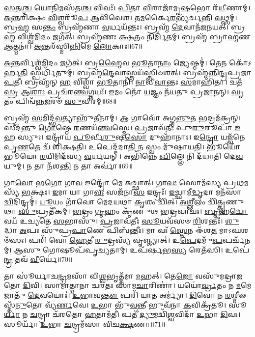 \-\ul{𑌸}\-𑌤\-\ul{𑌶𑍍𑌚} 𑌯𑍋\-\ul{𑌨𑌿}\-𑌮𑌸᳴𑌤\-\ul{𑌶𑍍𑌚} 𑌵𑌿𑌵𑌃᳴।
\-\ul{𑌪𑌿}\-𑌤𑌾 \ul{𑌵𑌿}\-𑌰𑌾𑌜𑌾᳴𑌮𑍃\-\ul{𑌷}\-𑌭𑍋 𑌰᳴\-\ul{𑌯𑍀}\-𑌣𑌾𑌮𑍍।
\-\ul{𑌅}\-𑌨𑍍𑌤𑌰𑌿᳴𑌕𑍍𑌷𑌂 \ul{𑌵𑌿}\-𑌶𑍍𑌵𑌰𑍂᳴\-\ul{𑌪} 𑌆𑌵𑌿᳴𑌵𑍇𑌶।
𑌤\-\ul{𑌮}\-𑌰𑍍𑌕𑍈\-\ul{𑌰}\-𑌭𑍍𑌯᳴𑌰𑍍𑌚𑌨𑍍𑌤𑌿 \ul{𑌵}\-𑌥𑍍𑌸𑌮𑍍।
𑌬𑍍𑌰\-\ul{𑌹𑍍𑌮} 𑌸\-\ul{𑌨𑍍𑌤𑌂} 𑌬𑍍𑌰𑌹𑍍𑌮᳴𑌣𑌾 \ul{𑌵}\-𑌰𑍍𑌧𑌯᳴𑌨𑍍𑌤𑌃।
𑌬𑍍𑌰𑌹𑍍𑌮᳴ \ul{𑌦𑍇}\-𑌵𑌾𑌨᳴𑌜𑌨𑌯𑌤𑍍।
𑌬𑍍𑌰\-\ul{𑌹𑍍𑌮} 𑌵𑌿𑌶𑍍𑌵᳴\-\ul{𑌮𑌿}\-𑌦𑌂 𑌜𑌗᳴𑌤𑍍।
𑌬𑍍𑌰𑌹𑍍𑌮᳴𑌣𑌃 \ul{𑌕𑍍𑌷}\-𑌤𑍍𑌰𑌂 𑌨𑌿𑌰𑍍𑌮𑌿᳴𑌤𑌮𑍍।
𑌬𑍍𑌰𑌹𑍍𑌮᳴ 𑌬𑍍𑌰𑌾\-\ul{𑌹𑍍𑌮}\-𑌣 \ul{𑌆}\-𑌤𑍍𑌮𑌨𑌾॑।
\-\ul{𑌅}\-𑌨𑍍𑌤𑌰᳴𑌸𑍍𑌮𑌿\-\ul{𑌨𑍍𑌨𑌿}\-𑌮𑍇 \ul{𑌲𑍋}\-𑌕𑌾𑌃॥67॥

\-\ul{𑌅}\-𑌨𑍍𑌤𑌰𑍍𑌵𑌿𑌶𑍍𑌵᳴\-\ul{𑌮𑌿}\-𑌦𑌂 𑌜𑌗᳴𑌤𑍍।
𑌬𑍍𑌰\-\ul{𑌹𑍍𑌮𑍈}\-𑌵 \ul{𑌭𑍂}\-𑌤𑌾\-\ul{𑌨𑌾𑌂} 𑌜𑍍𑌯𑍇𑌷𑍍𑌠𑌮𑍍॑।
𑌤𑍇\-\ul{𑌨} 𑌕𑍋᳴\-𑌽𑌰𑍍\mbox{}𑌹\-\ul{𑌤𑌿} 𑌸𑍍𑌪𑌰𑍍𑌧𑌿᳴𑌤𑍁𑌮𑍍।
𑌬𑍍𑌰𑌹𑍍𑌮᳴\-\ul{𑌨𑍍𑌦𑍇}\-𑌵𑌾𑌸𑍍𑌤𑍍𑌰𑌯᳴𑌸𑍍𑌤𑍍𑌰𑌿𑍞𑌶𑌤𑍍।
𑌬𑍍𑌰𑌹𑍍𑌮᳴𑌨𑍍𑌨𑌿𑌨𑍍𑌦𑍍𑌰𑌪𑍍𑌰𑌜𑌾\-\ul{𑌪}\-𑌤𑍀।
𑌬𑍍𑌰𑌹𑍍𑌮᳴𑌨𑍍 \ul{𑌹} 𑌵𑌿𑌶𑍍𑌵𑌾᳴ \ul{𑌭𑍂}\-𑌤𑌾𑌨𑌿᳴।
\-\ul{𑌨𑌾}\-𑌵𑍀\-\ul{𑌵𑌾}\-𑌨𑍍𑌤𑌃 \ul{𑌸}\-𑌮𑌾𑌹𑌿᳴𑌤𑌾।
𑌚𑌤᳴\-\ul{𑌸𑍍𑌰} 𑌆\-\ul{𑌶𑌾𑌃} 𑌪𑍍𑌰𑌚᳴𑌰\-\ul{𑌨𑍍𑌤𑍍𑌵}\-𑌗𑍍𑌨𑌯𑌃᳴।
\-\ul{𑌇}\-𑌮𑌂 𑌨𑍋᳴ \ul{𑌯}\-𑌜𑍍𑌞𑌂 𑌨᳴𑌯𑌤𑍁 𑌪𑍍𑌰\-\ul{𑌜𑌾}\-𑌨𑌨𑍍।
\-\ul{𑌘𑍃}\-𑌤𑌂 𑌪𑌿𑌨𑍍𑌵᳴\-\ul{𑌨𑍍𑌨}\-𑌜𑌰𑍞᳴ \ul{𑌸𑍁}\-𑌵𑍀𑌰𑌮𑍍॑॥68॥

𑌬𑍍𑌰𑌹𑍍𑌮᳴ \ul{𑌸}\-𑌮𑌿𑌦𑍍𑌭᳴\-\ul{𑌵}\-𑌤𑍍𑌯𑌾𑌹𑍁᳴𑌤𑍀𑌨𑌾𑌮𑍍।
𑌆 𑌗𑌾𑌵𑍋᳴ 𑌅𑌗𑍍𑌮\-\ul{𑌨𑍍𑌨𑍁}\-𑌤 \ul{𑌭}\-𑌦𑍍𑌰𑌮᳴𑌕𑍍𑌰𑌨𑍍।
𑌸𑍀𑌦᳴𑌨𑍍𑌤𑍁 \ul{𑌗𑍋}\-𑌷𑍍𑌠𑍇 \ul{𑌰}\-𑌣𑌯᳴\-\ul{𑌨𑍍𑌤𑍍𑌵}\-𑌸𑍍𑌮𑍇।
\-\ul{𑌪𑍍𑌰}\-𑌜𑌾𑌵᳴𑌤𑍀𑌃 𑌪𑍁\-\ul{𑌰𑍁}\-𑌰𑍂𑌪𑌾᳴ \ul{𑌇}\-𑌹 𑌸𑍍𑌯𑍁𑌃।
𑌇𑌨𑍍𑌦𑍍𑌰𑌾᳴𑌯 \ul{𑌪𑍂}\-𑌰𑍍𑌵𑍀\-\ul{𑌰𑍁}\-𑌷\-\ul{𑌸𑍋} 𑌦𑍁𑌹𑌾᳴𑌨𑌾𑌃।
𑌇\-\ul{𑌨𑍍𑌦𑍍𑌰𑍋} 𑌯𑌜𑍍𑌵᳴𑌨𑍇 𑌪𑍃\-\ul{𑌣}\-𑌤𑍇 𑌚᳴ 𑌶𑌿𑌕𑍍𑌷𑌤𑌿।
𑌉𑌪𑍇𑌦𑍍𑌦᳴𑌦𑌾\-\ul{𑌤𑌿} 𑌨 𑌸𑍍𑌵𑌂 𑌮𑍁᳴𑌷𑌾𑌯𑌤𑌿।
𑌭𑍂𑌯𑍋᳴𑌭𑍂𑌯𑍋 \ul{𑌰}\-𑌯𑌿𑌮𑌿𑌦᳴𑌸𑍍𑌯 \ul{𑌵}\-𑌰𑍍𑌧𑌯𑌨𑍍।
𑌅𑌭𑌿᳴𑌨𑍍𑌨𑍇 \ul{𑌖𑌿}\-𑌲𑍍𑌲𑍇 𑌨𑌿 𑌦᳴𑌧𑌾𑌤𑌿 𑌦𑍇\-\ul{𑌵}\-𑌯𑍁𑌮𑍍।
𑌨 𑌤𑌾 𑌨᳴𑌶\-\ul{𑌨𑍍𑌤𑌿} 𑌨 𑌤𑌾 𑌅𑌰𑍍𑌵𑌾॑॥69॥

𑌗𑌾\-\ul{𑌵𑍋} 𑌭\-\ul{𑌗𑍋} 𑌗𑌾\-\ul{𑌵} 𑌇𑌨𑍍𑌦𑍍𑌰𑍋᳴ 𑌮𑍇 𑌅𑌚𑍍𑌛𑌾𑌤𑍍।
𑌗𑌾\-\ul{𑌵𑌃} 𑌸𑍋𑌮᳴𑌸𑍍𑌯 𑌪𑍍𑌰\-\ul{𑌥}\-𑌮𑌸𑍍𑌯᳴ \ul{𑌭}\-𑌕𑍍𑌷𑌃।
\-\ul{𑌇}\-𑌮𑌾 𑌯𑌾 𑌗𑌾\-\ul{𑌵𑌃} 𑌸𑌜᳴𑌨𑌾\-\ul{𑌸} 𑌇𑌨𑍍𑌦𑍍𑌰𑌃᳴।
\-\ul{𑌇}\-𑌚𑍍𑌛𑌾𑌮𑍀\-\ul{𑌦𑍍𑌧𑍃}\-𑌦𑌾 𑌮𑌨᳴𑌸𑌾 \ul{𑌚𑌿}\-𑌦𑌿𑌨𑍍𑌦𑍍𑌰𑌮𑍍॑।
\-\ul{𑌯𑍂}\-𑌯𑌂 𑌗𑌾᳴𑌵𑍋 𑌮𑍇𑌦𑌯𑌥𑌾 \ul{𑌕𑍃}\-𑌶𑌂 𑌚𑌿᳴𑌤𑍍।
\-\ul{𑌅}\-\-\ul{𑌶𑍍𑌲𑍀}\-𑌲𑌂 𑌚𑌿᳴𑌤𑍍𑌕𑍃𑌣𑍁𑌥𑌾 \ul{𑌸𑍁}\-𑌪𑍍𑌰𑌤𑍀᳴𑌕𑌮𑍍।
\-\ul{𑌭}\-𑌦𑍍𑌰𑌂 \ul{𑌗𑍃}\-𑌹𑌂 𑌕𑍃᳴𑌣𑍁𑌥 𑌭𑌦𑍍𑌰𑌵𑌾𑌚𑌃।
\-\ul{𑌬𑍃}\-𑌹\-\ul{𑌦𑍍𑌵𑍋} 𑌵𑌯᳴ 𑌉𑌚𑍍𑌯𑌤𑍇 \ul{𑌸}\-𑌭𑌾𑌸𑍁᳴।
\-\ul{𑌪𑍍𑌰}\-𑌜𑌾𑌵᳴𑌤𑍀𑌃 \ul{𑌸𑍂}\-𑌯𑌵᳴𑌸𑍞 \ul{𑌰𑌿}\-𑌶𑌨𑍍𑌤𑍀𑌃॑।
\-\ul{𑌶𑍁}\-𑌦𑍍𑌧𑌾 \ul{𑌅}\-𑌪𑌃 𑌸𑍁᳴𑌪𑍍𑌰\-\ul{𑌪𑌾}\-𑌣𑍇 𑌪𑌿𑌬᳴𑌨𑍍𑌤𑍀𑌃।
𑌮𑌾 𑌵𑌃᳴ \ul{𑌸𑍍𑌤𑍇}\-𑌨 𑌈᳴𑌶\-\ul{𑌤} 𑌮𑌾𑌽𑌘𑌶𑍞᳴𑌸𑌃।
𑌪𑌰𑌿᳴ 𑌵𑍋 \ul{𑌹𑍇}\-𑌤𑍀 \ul{𑌰𑍁}\-𑌦𑍍𑌰𑌸𑍍𑌯᳴ 𑌵𑍃𑌞𑍍𑌜𑍍𑌯𑌾𑌤𑍍।
𑌉\-\ul{𑌪𑍇}\-𑌦𑌮𑍁᳴\-\ul{𑌪}\-𑌪𑌰𑍍𑌚᳴𑌨𑌮𑍍।
\-\ul{𑌆}\-𑌸𑍁 𑌗𑍋𑌷𑍂𑌪᳴𑌪𑍃𑌚𑍍𑌯𑌤𑌾𑌮𑍍।
𑌉𑌪᳴𑌰𑍍\mbox{}\-\ul{𑌷}\-𑌭\-\ul{𑌸𑍍𑌯} 𑌰𑍇𑌤᳴𑌸𑌿।
𑌉𑌪𑍇॑\-\ul{𑌨𑍍𑌦𑍍𑌰} 𑌤𑌵᳴ \ul{𑌵𑍀}\-𑌰𑍍𑌯𑍇॑॥70॥\anuvakamend[\-\ul{𑌚}\-\-\ul{𑌰𑌾}\-\-\ul{𑌮𑌿} 𑌕𑌨𑍀᳴\-\ul{𑌯𑍋}\-\-𑌽𑌨𑍍𑌯𑌾𑌨𑌰𑍍𑌪𑌿᳴𑌤𑌾 \ul{𑌪}\-𑌦𑌾\-\ul{𑌨𑌿} 𑌯𑌜𑍍𑌵᳴𑌸𑍁 𑌹𑌵𑌾𑌮𑌹𑍇 \ul{𑌵𑌿}\-𑌷𑍍𑌠𑌾 \ul{𑌲𑍋}\-𑌕𑌾𑌃 \ul{𑌸𑍁}\-𑌵𑍀\-\ul{𑌰}\-𑌮\-\ul{𑌰𑍍𑌵𑌾} 𑌪𑌿𑌬᳴\-\ul{𑌨𑍍𑌤𑍀𑌃} 𑌷𑌟𑍍𑌚᳴]

𑌤𑌾 𑌸𑍂॑𑌰𑍍𑌯𑌾𑌚\-\ul{𑌨𑍍𑌦𑍍𑌰}\-𑌮𑌸𑌾᳴ 𑌵𑌿\-\ul{𑌶𑍍𑌵}\-𑌭𑍃𑌤𑍍𑌤᳴𑌮𑌾 \ul{𑌮}\-𑌹𑌤𑍍।
𑌤𑍇\-\ul{𑌜𑍋} 𑌵𑌸𑍁᳴𑌮𑌦𑍍𑌰𑌾𑌜𑌤𑍋 \ul{𑌦𑌿}\-𑌵𑌿।
𑌸𑌾𑌮𑌾॑𑌤𑍍𑌮𑌾𑌨𑌾 𑌚𑌰𑌤𑌃 𑌸𑌾𑌮\-\ul{𑌚𑌾}\-𑌰𑌿𑌣𑌾॑।
𑌯𑌯𑍋॑\-\ul{𑌰𑍍𑌵𑍍𑌰}\-𑌤𑌂 𑌨 \ul{𑌮}\-𑌮𑍇 𑌜𑌾𑌤𑍁᳴ \ul{𑌦𑍇}\-𑌵𑌯𑍋𑌃॑।
\-\ul{𑌉}\-𑌭𑌾𑌵\-\ul{𑌨𑍍𑌤𑍗} 𑌪𑌰𑌿᳴ 𑌯𑌾\-\ul{𑌤} 𑌅𑌰𑍍𑌮𑍍𑌯𑌾॑।
\-\ul{𑌦𑌿}\-𑌵𑍋 𑌨 \ul{𑌰}\-𑌶𑍍𑌮𑍀𑍟𑌸𑍍𑌤᳴\-\ul{𑌨𑍁}\-𑌤𑍋 𑌵𑍍𑌯᳴\-\ul{𑌰𑍍𑌣}\-𑌵𑍇।
\-\ul{𑌉}\-𑌭𑌾 𑌭𑍁᳴\-\ul{𑌵}\-𑌨𑍍𑌤𑍀 𑌭𑍁𑌵᳴𑌨𑌾 \ul{𑌕}\-𑌵𑌿𑌕𑍍𑌰᳴𑌤𑍂।
𑌸𑍂\-\ul{𑌰𑍍𑌯𑌾} 𑌨 \ul{𑌚}\-𑌨𑍍𑌦𑍍𑌰𑌾 𑌚᳴𑌰𑌤𑍋 \ul{𑌹}\-𑌤𑌾𑌮᳴𑌤𑍀।
𑌪𑌤𑍀॑ \ul{𑌦𑍍𑌯𑍁}\-𑌮𑌦𑍍𑌵𑌿᳴\-\ul{𑌶𑍍𑌵}\-𑌵𑌿𑌦𑌾᳴ \ul{𑌉}\-𑌭𑌾 \ul{𑌦𑌿}\-𑌵𑌃।
𑌸𑍂𑌰𑍍𑌯𑌾᳴ \ul{𑌉}\-𑌭𑌾 \ul{𑌚}\-𑌨𑍍𑌦𑍍𑌰𑌮᳴𑌸𑌾 𑌵𑌿𑌚\-\ul{𑌕𑍍𑌷}\-𑌣𑌾॥71॥

